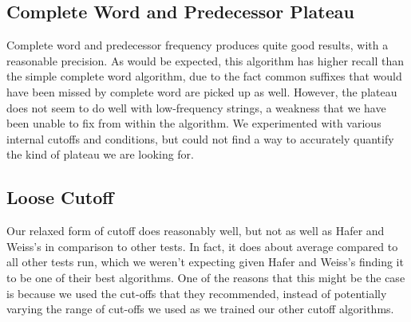 \documentclass[11pt,letterpaper]{article}
\begin{document}
    
\subsection{Complete Word and Predecessor Plateau}
  Complete word and predecessor frequency produces quite good results, with a reasonable precision. As would be expected, this algorithm has higher recall than the simple complete word algorithm, due to the fact common suffixes that would have been missed by complete word are picked up as well. However, the plateau does not seem to do well with low-frequency strings, a weakness that we have been unable to fix from within the algorithm. We experimented with various internal cutoffs and conditions, but could not find a way to accurately quantify the kind of plateau we are looking for.  

    
    
    
  
    
    
    

    
  
    
\subsection{Loose Cutoff}
  Our relaxed form of cutoff does reasonably well, but not as well as Hafer and Weiss's in comparison to other tests. In fact, it does about average compared to all other tests run, which we weren't expecting given Hafer and Weiss's finding it to be one of their best algorithms. One of the reasons that this might be the case is because we used the cut-offs that they recommended, instead of potentially varying the range of cut-offs we used as we trained our other cutoff algorithms. 
  
\end{document}
